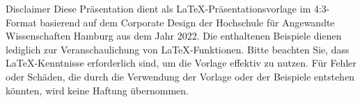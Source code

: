 
\begin{frame}{Disclaimer}
  Diese Präsentation dient als \LaTeX-Präsentationsvorlage im 4:3-Format basierend auf dem Corporate Design der Hochschule für Angewandte Wissenschaften Hamburg aus dem Jahr 2022. Die enthaltenen Beispiele dienen lediglich zur Veranschaulichung von \LaTeX-Funktionen. Bitte beachten Sie, dass \LaTeX-Kenntnisse erforderlich sind, um die Vorlage effektiv zu nutzen. Für Fehler oder Schäden, die durch die Verwendung der Vorlage oder der Beispiele entstehen könnten, wird keine Haftung übernommen.
\end{frame}